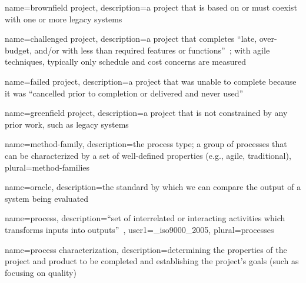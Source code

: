 
{
    name={brownfield project},
    description={a project that is based on or must coexist with one or more
            legacy systems} 
}

{
    name={challenged project},
    description={a project that completes ``late, over-budget, and/or with less
            than required features or functions''~\cite[p.1]{_chaos_2013}; with
            agile techniques, typically only schedule and cost concerns are
            measured} 
}


{
    name={failed project},
    description={a project that was unable to complete because it was 
        ``cancelled prior to completion or delivered and never 
        used''~\cite[p.1]{_chaos_2013}} 
}


{
    name={greenfield project},
    description={a project that is not constrained by any prior work, such as
            legacy systems} 
}

{
    name={method-family},
    description={the process type; a group of processes that can be
        characterized by a set of well-defined properties (e.g., agile,
        traditional)},
    plural={method-families}
}


{
    name={oracle},
    description={the standard by which we can compare the output of a
        system being evaluated} 
}


{
    name=process,
    description={``set of interrelated or interacting
                activities which transforms inputs into
                outputs''~\cite{_iso9000_2005}},
    user1={_iso9000_2005},
    plural=processes 
}


{
    name={process characterization},
    description={determining the properties of the project and product to be
        completed and establishing the project's goals (such as focusing on
        quality)~\cite{xu_using_2008}}
}


